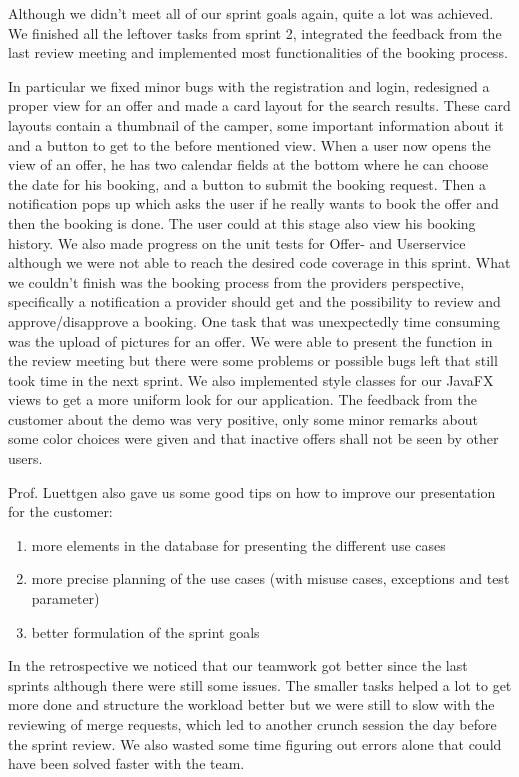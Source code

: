 Although we didn't meet all of our sprint goals again, quite a lot was achieved.
We finished all the leftover tasks from sprint 2, integrated the feedback from the last review meeting and implemented most functionalities of the booking process.

In particular we fixed minor bugs with the registration and login, redesigned a proper view for an offer and made a card layout for the search results.
These card layouts contain a thumbnail of the camper, some important information about it and a button to get to the before mentioned view.
When a user now opens the view of an offer, he has two calendar fields at the bottom where he can choose the date for his booking,
and a button to submit the booking request. Then a notification pops up which asks the user if he really wants to book the offer
and then the booking is done. The user could at this stage also view his booking history.
We also made progress on the unit tests for Offer- and Userservice although we were not able to reach the desired code coverage in this sprint.
What we couldn't finish was the booking process from the providers perspective, specifically a notification a provider should get and the possibility to review and approve/disapprove a booking.
One task that was unexpectedly time consuming was the upload of pictures for an offer. We were able to present the function
in the review meeting but there were some problems or possible bugs left that still took time in the next sprint.
We also implemented style classes for our JavaFX views to get a more uniform look for our application.
The feedback from the customer about the demo was very positive, only some minor remarks about some color choices were given and that inactive offers shall not be seen by other users.

Prof. Luettgen also gave us some good tips on how to improve our presentation for the customer:
\begin{enumerate}
    \item more elements in the database for presenting the different use cases
    \item more precise planning of the use cases (with misuse cases, exceptions and test parameter)
    \item better formulation of the sprint goals
\end{enumerate}

In the retrospective we noticed that our teamwork got better since the last sprints although there were still some issues.
The smaller tasks helped a lot to get more done and structure the workload better but we were still to slow with the reviewing of merge requests, which led to another crunch session the day before the sprint review.
We also wasted some time figuring out errors alone that could have been solved faster with the team.
